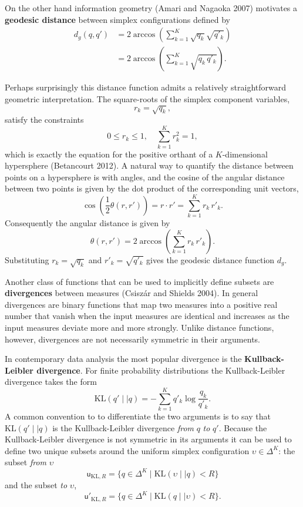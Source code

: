 \documentclass[
  letterpaper,
  DIV=11,
  numbers=noendperiod]{scrartcl}
\begin{document}
On the other hand information geometry (Amari and Nagaoka 2007)
motivates a \textbf{geodesic distance} between simplex configurations
defined by \begin{align*}
d_{g}(q, q')
&=
2 \arccos \left( \sum_{k = 1}^{K} \sqrt{ q_{k} } \sqrt { q'_{k} } \right)
\\
&=
2 \arccos \left( \sum_{k = 1}^{K} \sqrt{ q_{k} \, q'_{k} } \right).
\end{align*}

Perhaps surprisingly this distance function admits a relatively
straightforward geometric interpretation. The square-roots of the
simplex component variables, \[
r_{k} = \sqrt{ q_{k} },
\] satisfy the constraints \[
0 \le r_{k} \le 1, \quad \sum_{k = 1}^{K} r_{k}^{2} = 1,
\] which is exactly the equation for the positive orthant of a
\(K\)-dimensional hypersphere (Betancourt 2012). A natural way to
quantify the distance between points on a hypersphere is with angles,
and the cosine of the angular distance between two points is given by
the dot product of the corresponding unit vectors, \[
\cos \left( \frac{1}{2} \theta(r, r') \right)
=
r \cdot r'
=
\sum_{k = 1}^{K} r_{k} \, r'_{k}.
\] Consequently the angular distance is given by \[
\theta(r, r')
=
2 \arccos \left( \sum_{k = 1}^{K} r_{k} \, r'_{k} \right).
\] Substituting \(r_{k} = \sqrt{q_{k}}\) and \(r'_{k} = \sqrt{q'_{k}}\)
gives the geodesic distance function \(d_{g}\).

Another class of functions that can be used to implicitly define subsets
are \textbf{divergences} between measures (Csiszár and Shields 2004). In
general divergences are binary functions that map two measures into a
positive real number that vanish when the input measures are identical
and increases as the input measures deviate more and more strongly.
Unlike distance functions, however, divergences are not necessarily
symmetric in their arguments.

In contemporary data analysis the most popular divergence is the
\textbf{Kullback-Leibler divergence}. For finite probability
distributions the Kullback-Leibler divergence takes the form \[
\mathrm{KL}(q' \mid\mid q)
=
- \sum_{k = 1}^{K} q'_{k} \log \frac{ q_{k} }{ q'_{k} }.
\] A common convention to to differentiate the two arguments is to say
that \(\mathrm{KL}(q' \mid\mid q)\) is the Kullback-Leibler divergence
\emph{from} \(q\) \emph{to} \(q'\). Because the Kullback-Leibler
divergence is not symmetric in its arguments it can be used to define
two unique subsets around the uniform simplex configuration
\(\upsilon \in \Delta^{K}\): the subset \emph{from} \(\upsilon\) \[
\mathsf{u}_{\mathrm{KL}, R}
=
\{ q \in \Delta^{K} \mid \mathrm{KL}(\upsilon \mid\mid q) < R \}
\] and the subset \emph{to} \(\upsilon\), \[
\mathsf{u'}_{\mathrm{KL}, R}
=
\{ q \in \Delta^{K} \mid \mathrm{KL}(q \mid\mid \upsilon) < R \}.
\]
\end{document}

